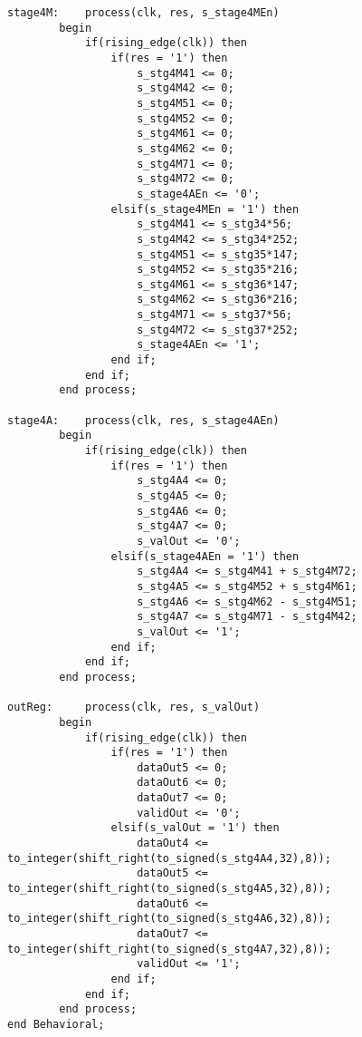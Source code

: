 \begin{appendices}
\begin{lstlisting}[style=vhdl]
stage4M:    process(clk, res, s_stage4MEn)
        begin
            if(rising_edge(clk)) then
                if(res = '1') then
                    s_stg4M41 <= 0;
                    s_stg4M42 <= 0;
                    s_stg4M51 <= 0;
                    s_stg4M52 <= 0;
                    s_stg4M61 <= 0;
                    s_stg4M62 <= 0;
                    s_stg4M71 <= 0;
                    s_stg4M72 <= 0;
                    s_stage4AEn <= '0';
                elsif(s_stage4MEn = '1') then
                    s_stg4M41 <= s_stg34*56;
                    s_stg4M42 <= s_stg34*252;
                    s_stg4M51 <= s_stg35*147;
                    s_stg4M52 <= s_stg35*216;
                    s_stg4M61 <= s_stg36*147;
                    s_stg4M62 <= s_stg36*216;
                    s_stg4M71 <= s_stg37*56;
                    s_stg4M72 <= s_stg37*252;
                    s_stage4AEn <= '1';
                end if;
            end if;
        end process;

stage4A:    process(clk, res, s_stage4AEn)
        begin
            if(rising_edge(clk)) then
                if(res = '1') then
                    s_stg4A4 <= 0;
                    s_stg4A5 <= 0;
                    s_stg4A6 <= 0;
                    s_stg4A7 <= 0;
                    s_valOut <= '0';
                elsif(s_stage4AEn = '1') then
                    s_stg4A4 <= s_stg4M41 + s_stg4M72;
                    s_stg4A5 <= s_stg4M52 + s_stg4M61;
                    s_stg4A6 <= s_stg4M62 - s_stg4M51;
                    s_stg4A7 <= s_stg4M71 - s_stg4M42;
                    s_valOut <= '1';
                end if;
            end if;
        end process;
        
outReg:     process(clk, res, s_valOut)
        begin
            if(rising_edge(clk)) then
                if(res = '1') then
                    dataOut5 <= 0;
                    dataOut6 <= 0;
                    dataOut7 <= 0;
                    validOut <= '0';
                elsif(s_valOut = '1') then
                    dataOut4 <= to_integer(shift_right(to_signed(s_stg4A4,32),8));
                    dataOut5 <= to_integer(shift_right(to_signed(s_stg4A5,32),8));
                    dataOut6 <= to_integer(shift_right(to_signed(s_stg4A6,32),8));
                    dataOut7 <= to_integer(shift_right(to_signed(s_stg4A7,32),8));
                    validOut <= '1';
                end if;
            end if;
        end process;
end Behavioral;
\end{lstlisting}
\end{appendices}
